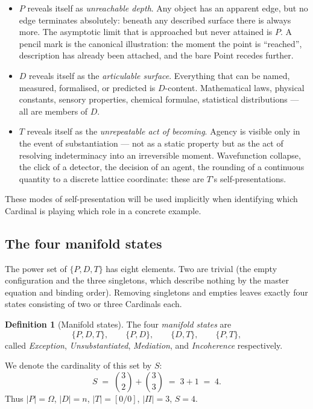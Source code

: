 \documentclass[11pt,a4paper]{article}
\theoremstyle{definition}
\newtheorem{definition}[theorem]{Definition}
\theoremstyle{remark}
\begin{document}
\begin{itemize}[leftmargin=*]
\item $P$ reveals itself as \emph{unreachable depth}. Any object has an apparent edge, but no edge terminates absolutely: beneath any described surface there is always more. The asymptotic limit that is approached but never attained is $P$. A pencil mark is the canonical illustration: the moment the point is ``reached'', description has already been attached, and the bare Point recedes further.
\item $D$ reveals itself as the \emph{articulable surface}. Everything that can be named, measured, formalised, or predicted is $D$-content. Mathematical laws, physical constants, sensory properties, chemical formulae, statistical distributions --- all are members of $D$.
\item $T$ reveals itself as the \emph{unrepeatable act of becoming}. Agency is visible only in the event of substantiation --- not as a static property but as the act of resolving indeterminacy into an irreversible moment. Wavefunction collapse, the click of a detector, the decision of an agent, the rounding of a continuous quantity to a discrete lattice coordinate: these are $T$'s self-presentations.
\end{itemize}

These modes of self-presentation will be used implicitly when identifying which Cardinal is playing which role in a concrete example.

\subsection{The four manifold states}

The power set of $\{P,D,T\}$ has eight elements. Two are trivial (the empty configuration and the three singletons, which describe nothing by the master equation and binding order). Removing singletons and empties leaves exactly four states consisting of two or three Cardinals each.

\begin{definition}[Manifold states]\label{def:states}
The four \emph{manifold states} are
\[
\{P,D,T\},\qquad \{P,D\},\qquad \{D,T\},\qquad \{P,T\},
\]
called \emph{Exception}, \emph{Unsubstantiated}, \emph{Mediation}, and \emph{Incoherence} respectively.
\end{definition}

We denote the cardinality of this set by $S$:
\begin{equation}
S \;=\; \binom{3}{2}+\binom{3}{3} \;=\; 3+1 \;=\; 4.
\label{eq:S}
\end{equation}
Thus $|P|=\Omega$, $|D|=n$, $|T|=[0/0]$, $|\Pi|=3$, $S=4$.
\end{document}
